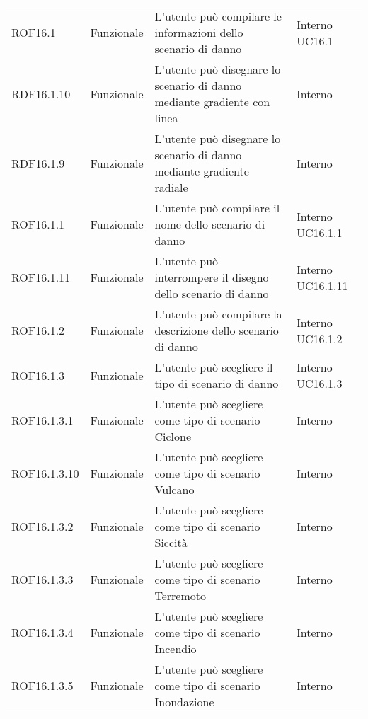 \begin{longtable}{p{2cm}!{\VRule[1pt]}p{2cm}!{\VRule[1pt]}p{5cm}!{\VRule[1pt]}p{1.5cm}}
ROF16.1&Funzionale\newline  & L'utente può compilare le informazioni dello scenario di danno & Interno \newline UC16.1
 \\
RDF16.1.10&Funzionale\newline  & L'utente può disegnare lo scenario di danno mediante gradiente con linea & Interno \\
RDF16.1.9&Funzionale\newline  & L'utente può disegnare lo scenario di danno mediante gradiente radiale & Interno \\
ROF16.1.1&Funzionale\newline  & L'utente può compilare il nome dello scenario di danno & Interno \newline UC16.1.1
 \\
ROF16.1.11&Funzionale\newline  & L'utente può interrompere il disegno dello scenario di danno & Interno \newline UC16.1.11
 \\
ROF16.1.2&Funzionale\newline  & L'utente può compilare la descrizione dello scenario di danno & Interno \newline UC16.1.2
 \\
ROF16.1.3&Funzionale\newline  & L'utente può scegliere il tipo di scenario di danno & Interno \newline UC16.1.3
 \\
ROF16.1.3.1&Funzionale\newline  & L'utente può scegliere come tipo di scenario Ciclone & Interno \\
ROF16.1.3.10&Funzionale\newline  & L'utente può scegliere come tipo di scenario Vulcano & Interno \\
ROF16.1.3.2&Funzionale\newline  & L'utente può scegliere come tipo di scenario Siccità & Interno \\
ROF16.1.3.3&Funzionale\newline  & L'utente può scegliere come tipo di scenario Terremoto & Interno \\
ROF16.1.3.4&Funzionale\newline  & L'utente può scegliere come tipo di scenario Incendio & Interno \\
ROF16.1.3.5&Funzionale\newline  & L'utente può scegliere come tipo di scenario Inondazione & Interno \\

\end{longtable}
